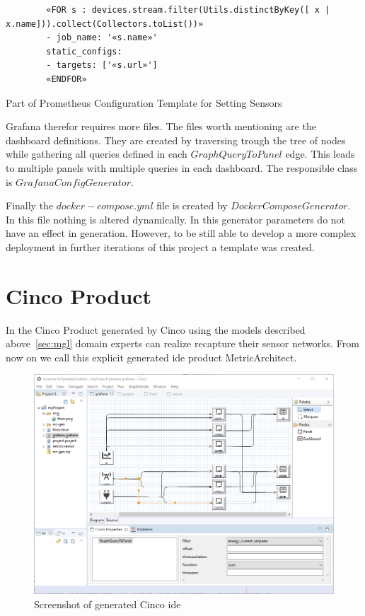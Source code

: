 \begin{listing}
	\begin{verbatim}
		«FOR s : devices.stream.filter(Utils.distinctByKey([ x | x.name])).collect(Collectors.toList())»
		- job_name: '«s.name»'
		static_configs:
		- targets: ['«s.url»']
		«ENDFOR»
	\end{verbatim}
	\caption{Part of Prometheus Configuration Template for Setting Sensors}
	\label{lst:xtend_prom}
\end{listing} 

Grafana therefor requires more files. The files worth mentioning are the dashboard definitions. They are created by traversing trough the tree of nodes while gathering all queries defined in each $GraphQueryToPanel$ edge. This leads to multiple panels with multiple queries in each dashboard. The responsible class is $GrafanaConfigGenerator$.

Finally the $docker-compose.yml$ file is created by $DockerComposeGenerator$. In this file nothing is altered dynamically. In this generator parameters do not have an effect in generation. However, to be still able to develop a more complex deployment in further iterations of this project a template was created.

\section{Cinco Product}

In the Cinco Product generated by Cinco using the models described above~\ref{sec:mgl} domain experts can realize recapture their sensor networks. From now on we call this explicit generated \gls{ide} product MetricArchitect. 

\begin{figure}
	\includegraphics[width=\textwidth]{assets/images/editor}
	\caption{Screenshot of generated Cinco \gls{ide}}
	\label{fig:editor}
\end{figure}


